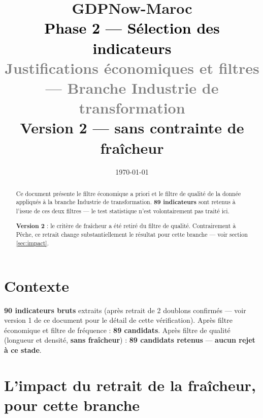 \documentclass[11pt,a4paper]{article}
\title{\vspace{-1.3cm}\textcolor{bleuprincip}{\Huge\bfseries GDPNow-Maroc}\\[0.3cm]
\textcolor{black}{\Large Phase 2 --- Sélection des indicateurs}\\[0.15cm]
\textcolor{gray}{\large Justifications économiques et filtres --- Branche Industrie de transformation}\\[0.1cm]
\textcolor{orangealerte}{\normalsize Version 2 --- sans contrainte de fraîcheur}}
\author{}
\date{\today}
\begin{document}
\maketitle
\thispagestyle{empty}

\begin{abstract}
\noindent Ce document présente le filtre économique a priori et le filtre de qualité de la donnée appliqués à la branche Industrie de transformation. \textbf{89 indicateurs} sont retenus à l'issue de ces deux filtres --- le test statistique n'est volontairement pas traité ici.

\textbf{Version 2} : le critère de fraîcheur a été retiré du filtre de qualité. Contrairement à Pêche, ce retrait change substantiellement le résultat pour cette branche --- voir section \ref{sec:impact}.
\end{abstract}

\tableofcontents
\vspace{0.3cm}

\section{Contexte}

\begin{fichebox}
\textbf{90 indicateurs bruts} extraits (après retrait de 2 doublons confirmés --- voir version 1 de ce document pour le détail de cette vérification). Après filtre économique et filtre de fréquence : \textbf{89 candidats}. Après filtre de qualité (longueur et densité, \textbf{sans fraîcheur}) : \textbf{89 candidats retenus} --- \textbf{aucun rejet à ce stade}.
\end{fichebox}

\section{L'impact du retrait de la fraîcheur, pour cette branche}
\label{sec:impact}
\end{document}
